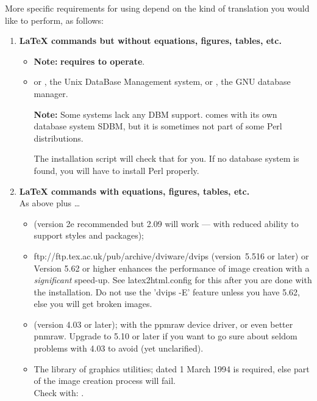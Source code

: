 \medskip\htmlrule
\medskip\noindent
More specific requirements for using \latextohtml{} 
depend on the kind of translation you would like to perform, as follows:
%
\begin{enumerate}
\item 
{}%
\textbf{\LaTeX{}  commands but without equations, figures, tables, etc.} \hfill
\begin{itemize}
\item 
{}
\begin{small}
\textbf{Note:} \latextohtml{}\textbf{ requires  to operate}.
\end{small}\html{\smallskip}


%
\item 
{} or , the Unix DataBase Management system,
or , the GNU database manager.

\textbf{Note: }Some systems lack any DBM support.
 comes with its own database system SDBM, but it is sometimes
not part of some Perl distributions.

The installation script  will check that for you.
If no database system is found, you will have to install Perl
properly.
\end{itemize}

%
%
%
\item 
\textbf{\LaTeX{}  commands with equations, figures, tables, etc.} \\
As above plus \dots
%
\begin{itemize}
\item {} (version 2e recommended but 2.09 will work --- with
reduced ability to support styles and packages);
%
\item 
{}
{ftp://ftp.tex.ac.uk/pub/archive/dviware/dvips}
(version~5.516 or later) or \\
  Version 5.62 or higher enhances the performance of image creation
  with a \emph{significant} speed-up. See latex2html.config for this
  after you are done with the installation.
  Do not use the 'dvips -E' feature unless you have 5.62, else you
  will get broken images.
%
\item 
{}  (version 4.03 or later);
  with the ppmraw device driver, or even better pnmraw.
  Upgrade to 5.10 or later if you want to go sure about seldom problems
  with 4.03 to avoid (yet unclarified).
%
%
%
\item 
The 
library of graphics utilities;  dated 1 March 1994
is required, else part of the image creation process will fail.\\
Check with:  .


\end{itemize}
\end{enumerate}
